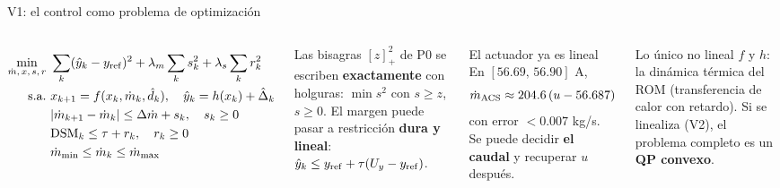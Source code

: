 \documentclass[aspectratio=169,10pt]{beamer}
\newcommand{\key}[1]{{\color{USMBlue}\bfseries #1}}
\newcommand{\yhat}{\hat y}
\begin{document}
\begin{frame}{V1: el control como problema de optimización}
\begin{columns}[T]
{\small
\vspace{-.3cm}
\begin{align*}
\min_{\dot m,\,x,\,s,\,r}\ & \sum_{k}(\yhat_k-y_{\rm ref})^2+\lambda_m\sum_k s_k^2+\lambda_s\sum_k r_k^2\\
\text{s.a.}\ & x_{k+1}=f(x_k,\dot m_k,\hat d_k),\quad \yhat_k=h(x_k)+\hat\Delta_k\\
& |\dot m_{k+1}-\dot m_k|\leq\Delta\dot m+s_k,\quad s_k\geq0\\
& \mathrm{DSM}_k\leq\tau+r_k,\quad r_k\geq0\\
& \dot m_{\min}\leq\dot m_k\leq\dot m_{\max}
\end{align*}\par}
\small Las bisagras $[z]_+^2$ de P0 se escriben \key{exactamente} con holguras: $\min s^2$ con $s\geq z$, $s\geq0$. El margen puede pasar a restricción \key{dura y lineal}: $\yhat_k\leq y_{\rm ref}+\tau(U_y-y_{\rm ref})$.
\begin{exampleblock}{El actuador ya es lineal}
En $[56.69,\,56.90]$ A,
\[
\dot m_{\rm ACS}\approx 204.6\,(u-56.687)
\]
con error $<0.007$ kg/s. Se puede decidir \key{el caudal} y recuperar $u$ después.
\end{exampleblock}
\begin{alertblock}{Lo único no lineal}
$f$ y $h$: la dinámica térmica del ROM (transferencia de calor con retardo). Si se linealiza (V2), el problema completo es un \key{QP convexo}.
\end{alertblock}
\end{columns}
\end{frame}
\end{document}
